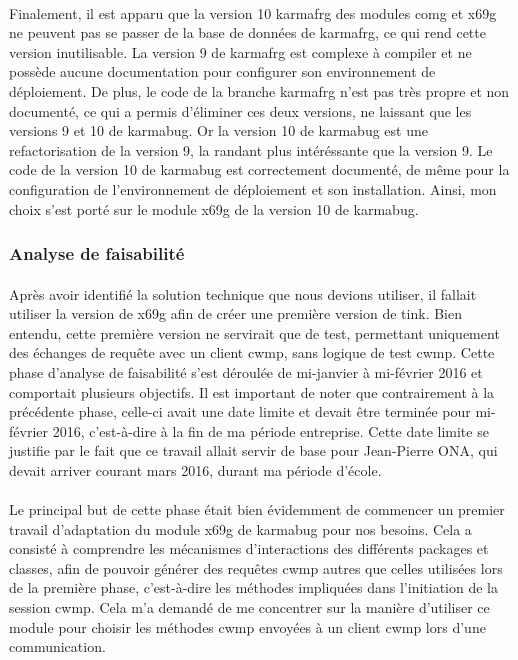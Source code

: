 \documentclass[12pt,a4paper]{report}
\begin{document}
\paragraph*{} Finalement, il est apparu que la version 10 \gls{karmafrg} des modules \gls{comg} et \gls{x69g} ne peuvent pas se passer de la base de données de \gls{karmafrg}, ce qui rend cette version inutilisable. La version 9 de \gls{karmafrg} est complexe à compiler et ne possède aucune documentation pour configurer son environnement de déploiement. De plus, le code de la branche \gls{karmafrg} n’est pas très propre et non documenté, ce qui a permis d’éliminer ces deux versions, ne laissant que les versions 9 et 10 de \gls{karmabug}. Or la version 10 de \gls{karmabug} est une refactorisation de la version 9, la randant plus intéréssante que la version 9. Le code de la version 10 de \gls{karmabug} est correctement documenté, de même pour la configuration de l’environnement de déploiement et son installation. Ainsi, mon choix s’est porté sur le module \gls{x69g} de la version 10 de \gls{karmabug}. \\
\subsubsection{Analyse de faisabilité}
\paragraph*{}Après avoir identifié la solution technique que nous devions utiliser, il
fallait utiliser la version de \gls{x69g} afin de créer une première version de \gls{tink}. Bien entendu, cette première version ne servirait que de test, permettant uniquement des échanges de requête avec un client \gls{cwmp}, sans logique de test \gls{cwmp}. Cette phase d’analyse de faisabilité s’est déroulée de mi-janvier à mi-février 2016 et comportait plusieurs objectifs. Il est important de noter que contrairement à la précédente phase, celle-ci avait une date limite et devait être terminée pour mi-février 2016, c’est-à-dire à la fin de ma période entreprise. Cette date limite se justifie par le fait que ce travail allait servir de base pour Jean-Pierre ONA, qui devait arriver courant mars 2016, durant ma période d’école.
\paragraph*{}Le principal but de cette phase était bien évidemment de commencer un
premier travail d’adaptation du module \gls{x69g} de \gls{karmabug} pour nos besoins. Cela a consisté à comprendre les mécanismes d’interactions des différents packages et classes, afin de pouvoir générer des requêtes \gls{cwmp} autres que celles utilisées lors de la première phase, c’est-à-dire les méthodes impliquées dans l’initiation de la session \gls{cwmp}. Cela m’a demandé de me concentrer sur la manière d’utiliser ce module pour choisir les méthodes \gls{cwmp} envoyées à un client \gls{cwmp} lors d’une communication.
\end{document}
